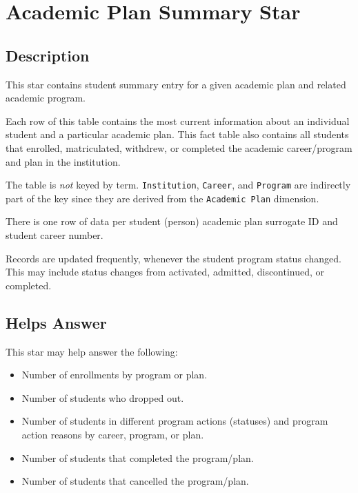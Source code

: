 \documentclass[
]{book}
\providecommand{\tightlist}{%
  \setlength{\itemsep}{0pt}\setlength{\parskip}{0pt}}
\begin{document}
\hypertarget{academic-plan-summary-star}{%
\chapter{Academic Plan Summary Star}\label{academic-plan-summary-star}}

\hypertarget{description}{%
\section{Description}\label{description}}

This star contains student summary entry for a given academic plan and related academic program.

Each row of this table contains the most current information about an individual student and a particular academic plan. This fact table also contains all students that enrolled, matriculated, withdrew, or completed the academic career/program and plan in the institution.

The table is \emph{not} keyed by term. \texttt{Institution}, \texttt{Career}, and \texttt{Program} are indirectly part of the key since they are derived from the \texttt{Academic\ Plan} dimension.

There is one row of data per student (person) academic plan surrogate ID and student career number.

Records are updated frequently, whenever the student program status changed. This may include status changes from activated, admitted, discontinued, or completed.

\hypertarget{helps-answer}{%
\section{Helps Answer}\label{helps-answer}}

This star may help answer the following:

\begin{itemize}
\tightlist
\item
  Number of enrollments by program or plan.
\item
  Number of students who dropped out.
\item
  Number of students in different program actions (statuses) and program action reasons by career, program, or plan.
\item
  Number of students that completed the program/plan.
\item
  Number of students that cancelled the program/plan.
\end{itemize}
\end{document}
